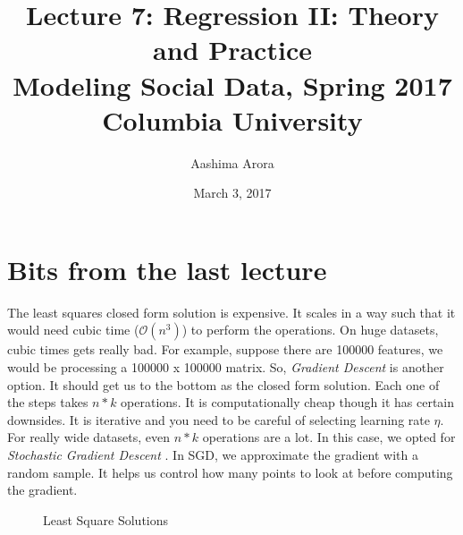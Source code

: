 \documentclass{article}
\title{
Lecture 7: Regression II: Theory and Practice \\  %
Modeling Social Data, Spring 2017 \\   %
Columbia University                    %
}
\author{Aashima Arora}                     %
\date{March 3, 2017}                %
\begin{document}
\maketitle



\section{Bits from the last lecture}
The least squares closed form solution is expensive. It scales in a way such that it would need cubic time ($\mathcal{O}(n^3)$) to perform the operations. 
On huge datasets, cubic times gets really bad. For example, suppose there are 100000 features, we would be processing a 100000 x 100000 matrix.
So, \emph {Gradient Descent} is another option. It should get us to the bottom as the closed form solution. Each one of the steps takes $n*k$ operations. It is computationally
cheap though it has certain downsides. It is iterative and you need to be careful of selecting learning rate $\eta$. For really wide datasets, even $n*k$ operations are a lot. In this case,
we opted for \emph {Stochastic Gradient Descent }. In SGD, we approximate the gradient with a random sample. It helps us control how many points to look at before computing the gradient. 


\begin{figure}[h]
\centering
\caption{Least Square Solutions}
{\setlength{\fboxsep}{20pt}
\setlength{\fboxrule}{1pt}
\textcolor{DarkBlue}{}
}
\end{figure} 
\end{document}
